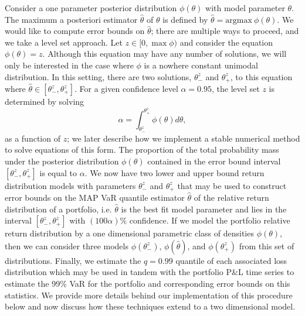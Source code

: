 \documentclass{amsart}
\begin{document}
Consider a one parameter posterior distribution $\phi(\theta)$  with 
model parameter $\theta$.  The maximum a posteriori estimator $\hat{\theta}$ 
of $\theta$ is defined by $\hat{\theta} = \mathrm{argmax}\:\phi(\theta)$. We would 
like to compute error bounds on $\hat{\theta}$; there are multiple ways to proceed, and 
we take a level set approach. Let $z\in[0,\max\phi)$ and consider 
    the equation $\phi(\theta)=z$.  Although 
this equation may have any number of solutions, we will only be interested 
in the case where $\phi$ is a nowhere constant unimodal distribution. 
In this setting, there are 
two solutions, $\theta_-^z$ and $\theta_+^z$, to this equation where $\hat{\theta}\in[\theta_-^z,\theta_+^z]$.  
For a given confidence level $\alpha=0.95$, the level set $z$ is determined by solving 
%
\begin{equation}
    \alpha = \int_{\theta_-^z}^{\theta_+^z} \phi(\theta)d\theta,
\end{equation}
%
as a function of $z$; we later describe how we implement a stable numerical method 
to solve equations of this form.  The proportion of the total probability mass under the posterior 
distribution $\phi(\theta)$ contained in the
error bound interval $[\theta_-^z,\theta_+^z]$ is equal to $\alpha$.  We now have two lower and upper 
bound return distribution models with parameters $\theta_-^z$ and $\theta_+^z$ that may be used 
to construct error bounds on the MAP VaR quantile estimator $\hat\theta$
of the relative return distribution of a portfolio, i.e. 
$\hat{\theta}$ is the best fit model parameter and lies in the interval $[\theta_-^z,\theta_+^z]$
with $(100\alpha)\%$ confidence.
If we model the portfolio relative return distribution by a 
one dimensional parametric class of densities $\phi(\theta)$, then we can consider three 
models $\phi(\theta_-^z)$, $\phi(\hat{\theta})$, and $\phi(\theta_+^z)$ from 
this set of distributions. Finally, we estimate the $q=0.99$ quantile of  
each associated loss distribution which may be used 
in tandem with the portfolio P\&L time series to estimate the 99\% VaR for the portfolio and corresponding 
error bounds on this statistics.
We provide more details behind our implementation of this procedure below and now 
discuss how these techniques extend to a two dimensional model.
\end{document}

